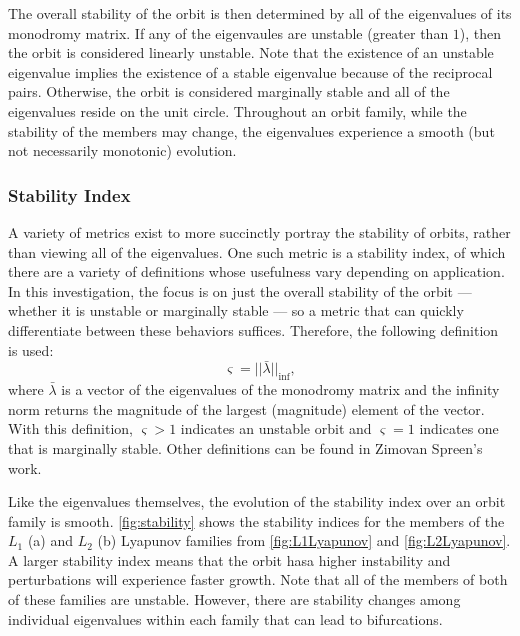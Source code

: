 The overall stability of the orbit is then determined by all of the eigenvalues of its monodromy
matrix. If any of the eigenvaules are unstable (greater than $1$), then the orbit is considered
linearly unstable. Note that the existence of an unstable eigenvalue implies the existence of a
stable eigenvalue because of the reciprocal pairs. Otherwise, the orbit is considered marginally
stable and all of the eigenvalues reside on the unit circle. Throughout an orbit family, while the
stability of the members may change, the eigenvalues experience a smooth (but not necessarily
monotonic) evolution.

\subsubsection{Stability Index}
A variety of metrics exist to more succinctly portray the stability of orbits, rather than viewing
all of the eigenvalues. One such metric is a stability index, of which there are a variety of
definitions whose usefulness vary depending on application. In this investigation, the focus is on
just the overall stability of the orbit --- whether it is unstable or marginally stable --- so a
metric that can quickly differentiate between these behaviors suffices. Therefore, the following
definition is used\cite{Power:2019}:
\begin{equation}
    \varsigma=||\bar{\lambda}||_{\inf},
    \label{eq:stabilityindex}
\end{equation}
where $\bar{\lambda}$ is a vector of the eigenvalues of the monodromy matrix and the infinity norm
returns the magnitude of the largest (magnitude) element of the vector. With this definition,
$\varsigma>1$ indicates an unstable orbit and $\varsigma=1$ indicates one that is marginally
stable. Other definitions can be found in Zimovan Spreen's work\cite{ZimovanSpreen:2021}.

Like the eigenvalues themselves, the evolution of the stability index over an orbit family is
smooth. \cref{fig:stability} shows the stability indices for the members of the $L_{1}$ (a) and
$L_{2}$ (b) Lyapunov families from \cref{fig:L1Lyapunov} and \cref{fig:L2Lyapunov}. A larger
stability index means that the orbit hasa higher instability and perturbations will experience
faster growth. Note that all of the members of both of these families are unstable. However, there
are stability changes among individual eigenvalues within each family that can lead to
bifurcations.

